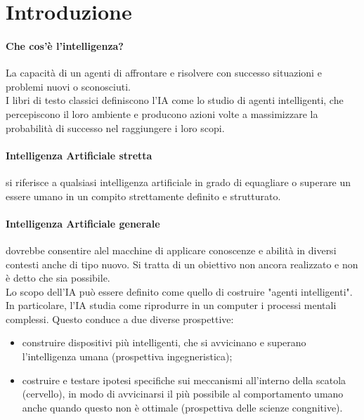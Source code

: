 \section{Introduzione}

\paragraph{Che cos'è l'intelligenza?}
La capacità di un agenti di affrontare e risolvere con successo situazioni e
problemi nuovi o sconosciuti.\\
I libri di testo classici definiscono l'IA come lo studio di agenti
intelligenti, che percepiscono il loro ambiente e producono azioni volte a
massimizzare la probabilità di successo nel raggiungere i loro scopi.

\paragraph{Intelligenza Artificiale stretta} si riferisce a qualsiasi
intelligenza artificiale in grado di equagliare o superare un essere umano in un
compito strettamente definito e strutturato.

\paragraph{Intelligenza Artificiale generale} dovrebbe consentire alel macchine
di applicare conoscenze e abilità in diversi contesti anche di tipo nuovo. Si
tratta di un obiettivo non ancora realizzato e non è detto che sia possibile.\\

Lo scopo dell'IA può essere definito come quello di costruire "agenti
intelligenti". In particolare, l'IA studia come riprodurre in un computer i
processi mentali complessi. Questo conduce a due diverse prospettive:
\begin{itemize}
	\item construire dispositivi più intelligenti, che si avvicinano e superano
		l'intelligenza umana (prospettiva ingegneristica);

	\item costruire e testare ipotesi specifiche sui meccanismi all'interno 
		della scatola (cervello), in modo di avvicinarsi il più possibile al 
		comportamento umano anche quando questo non è ottimale (prospettiva 
		delle scienze congnitive).
\end{itemize}
